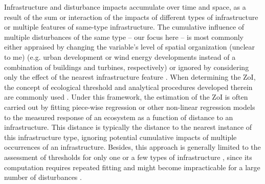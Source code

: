 \documentclass[titlepage]{article}
\begin{document}
Infrastructure and disturbance impacts accumulate over time and space, as a result of the sum or interaction of the impacts of different types of infrastructure or multiple features of same-type infrastructure. 
The cumulative influence of multiple disturbances of the same type -- our focus here -- is most commonly either appraised by changing the variable's level of spatial organization (unclear to me) (e.g. urban development or wind energy developments instead of a combination of buildings and turbines, respectively) or ignored by considering only the effect of the nearest infrastructure feature \citep[e.g.][]{torres_assessing_2016}. When determining the ZoI, the concept of ecological threshold %
and analytical procedures developed therein are commonly used \citep{ficetola_ecological_2009}. Under this framework, the estimation of the ZoI is often carried out by fitting piece-wise regression or other non-linear regression models \citep[such as an exponential decay or generalized additive models;][]{skarin_out_2018, ficetola_ecological_2009} to the measured response of an ecosystem as a function of distance to an infrastructure. This distance is typically the distance to the nearest instance of this infrastructure type, ignoring potential cumulative impacts of multiple occurrences of an infrastructure. Besides, this approach is generally limited to the assessment of thresholds for only one or a few types of infrastructure \citep[e.g.][]{boulanger_estimating_2012}, since its computation requires repeated fitting and might become impracticable for a large number of disturbances \citep{lee_estimating_2020}. 
\end{document}
